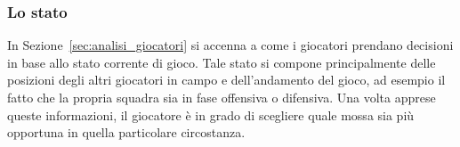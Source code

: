 %

%

\subsubsection{Lo stato}
\label{sec:entita_coinvolte_stato}

In Sezione~\ref{sec:analisi_giocatori} si accenna a come i giocatori prendano decisioni in base allo stato corrente di gioco. Tale stato si compone principalmente delle posizioni degli altri giocatori in campo e dell'andamento del gioco, ad esempio il fatto che la propria squadra sia in fase offensiva o difensiva. Una volta apprese queste informazioni, il giocatore è in grado di scegliere quale mossa sia più opportuna in quella particolare circostanza.\\

